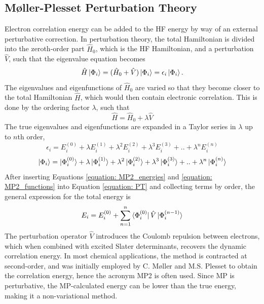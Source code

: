 \subsection{M{\o}ller-Plesset Perturbation Theory}\label{section: MP2}
Electron correlation energy can be added to the \ac{HF} energy by way of an external perturbative correction. In perturbation theory, the total Hamiltonian is divided into the zeroth-order part $\hat{H}_{0}$, which is the \ac{HF} Hamiltonian, and a perturbation $\hat{V}$, such that the eigenvalue equation becomes
\begin{equation}\label{equation: PT}
    \hat{H}\ket{\Phi_{i}}=(\hat{H}_{0}+\hat{V})\ket{\Phi_{i}}=\epsilon_{i}\ket{\Phi_{i}}.
\end{equation}
The eigenvalues and eigenfunctions of $\hat{H}_{0}$ are varied so that they become closer to the total Hamiltonian $\hat{H}$, which would then contain electronic correlation. This is done by the ordering factor $\lambda$, such that
\begin{equation}
    \hat{H}=\hat{H}_{0}+\lambda\hat{V}
\end{equation}
The true eigenvalues and eigenfunctions are expanded in a Taylor series in $\lambda$ up to $n$th order,
\begin{equation}\label{equation: MP2_energies}
    \epsilon_{i}=E_{i}^{(0)}+\lambda{}E_{i}^{(1)}+\lambda^{2}E_{i}^{(2)}+\lambda^{3}E_{i}^{(3)}+..+\lambda^{n}E_{i}^{(n)}
\end{equation}
\begin{equation}\label{equation: MP2_functions}
    \ket{\Phi_{i}}=\ket{\Phi_{i}^{(0)}}+\lambda{}\ket{\Phi_{i}^{(1)}}+\lambda^{2}\ket{\Phi_{i}^{(2)}}+\lambda^{3}\ket{\Phi_{i}^{(3)}}+..+\lambda^{n}\ket{\Phi_{i}^{(n)}}
\end{equation}
After inserting Equations \ref{equation: MP2_energies} and \ref{equation: MP2_functions} into Equation \ref{equation: PT} and collecting terms by order, the general expression for the total energy is
\begin{equation}
E_{i}=E_{i}^{(0)}+\sum_{n=1}^{n}\bra{\Phi_{i}^{(0)}}\hat{V}\ket{\Phi_{i}^{(n-1)}}
\end{equation}
The perturbation operator $\hat{V}$ introduces the Coulomb repulsion between electrons, which when combined with excited Slater determinants, recovers the dynamic correlation energy. In most chemical applications, the method is contracted at second-order, and was initially employed by C. M{\o}ller and M.S. Plesset to obtain the correlation energy, hence the acronym \ac{MP2} is often used.\cite{Moller1934} Since MP is perturbative, the MP-calculated energy can be lower than the true energy, making it a non-variational method.
